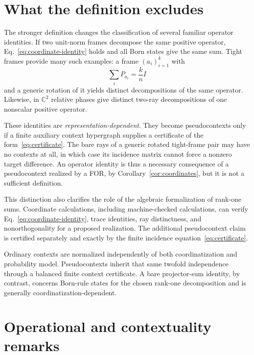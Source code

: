 \documentclass[
  twocolumn,
  aps,
  pra,
  floatfix,
  amsmath,amssymb,
  longbibliography
]{revtex4-2}
\theoremstyle{definition}
\theoremstyle{remark}
\newcommand{\C}{\mathbb C}
\begin{document}
\section{What the definition excludes}
\label{sec:excludes}

The stronger definition changes the classification of several familiar
operator identities.  If two unit-norm frames decompose the same positive
operator, Eq.~\eqref{eq:coordinate-identity} holds and all Born states give
the same sum.  Tight frames provide many such examples: a frame
$(a_i)_{i=1}^k$ with
\[
 \sum_i P_{a_i}=\frac{k}{n}I
\]
and a generic rotation of it yields distinct decompositions of the same
operator.  Likewise, in $\C^2$ relative phases give distinct two-ray
decompositions of one nonscalar positive operator.

These identities are \emph{representation-dependent}.  They
become pseudocontexts only if a finite auxiliary context hypergraph supplies
a certificate of the form~\eqref{eq:certificate}.  The bare rays of a generic
rotated tight-frame pair may have no contexts at all, in which case its
incidence matrix cannot force a nonzero target difference.  An operator
identity is thus a necessary consequence of a pseudocontext realized by a
FOR, by Corollary~\ref{cor:coordinates}, but it is not a sufficient
definition.

This distinction also clarifies the role of the algebraic formalization of
rank-one sums.  Coordinate calculations, including machine-checked
calculations, can verify Eq.~\eqref{eq:coordinate-identity}, trace identities,
ray distinctness, and nonorthogonality for a proposed realization.  The
additional pseudocontext claim is certified separately and exactly by the
finite incidence equation~\eqref{eq:certificate}.

Ordinary contexts are normalized independently of both coordinatization and
probability model.  Pseudocontexts inherit that same twofold independence
through a balanced finite context certificate.  A bare projector-sum identity,
by contrast, concerns Born-rule states for the chosen rank-one decomposition
and is generally coordinatization-dependent.

\section{Operational and contextuality remarks}
\label{sec:operational}
\end{document}
